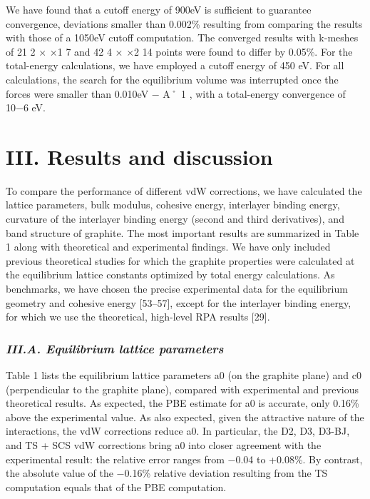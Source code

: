 \documentclass{article}
\begin{document}
We have found that a cutoff energy of 900eV is sufficient to guarantee convergence, deviations smaller than 0.002\% resulting from comparing the results with those of a 1050eV cutoff computation. The converged results with k-meshes of 21 2 × ×1 7 and 42 4 × ×2 14 points were found to differ by 0.05\%. For the total-energy calculations, we have employed a cutoff energy of 450 eV. For all calculations, the search for the equilibrium volume was interrupted once the forces were smaller than 0.010eV − A˚ 1 , with a total-energy convergence of 10−6 eV.

\section{\textbf{III. Results and discussion}}

To compare the performance of different vdW corrections, we have calculated the lattice parameters, bulk modulus, cohesive energy, interlayer binding energy, curvature of the interlayer binding energy (second and third derivatives), and band structure of graphite. The most important results are summarized in Table 1 along with theoretical and experimental findings. We have only included previous theoretical studies for which the graphite properties were calculated at the equilibrium lattice constants optimized by total energy calculations. As benchmarks, we have chosen the precise experimental data for the equilibrium geometry and cohesive energy [53–57], except for the interlayer binding energy, for which we use the theoretical, high-level RPA results [29].

\subsubsection{\textit{III.A. Equilibrium lattice parameters}}

Table 1 lists the equilibrium lattice parameters a0 (on the graphite plane) and c0 (perpendicular to the graphite plane), compared with experimental and previous theoretical results. As expected, the PBE estimate for a0 is accurate, only 0.16\% above the experimental value. As also expected, given the attractive nature of the interactions, the vdW corrections reduce a0. In particular, the D2, D3, D3-BJ, and TS + SCS vdW corrections bring a0 into closer agreement with the experimental result: the relative error ranges from −0.04 to +0.08\%. By contrast, the absolute value of the −0.16\% relative deviation resulting from the TS computation equals that of the PBE computation.
\end{document}
